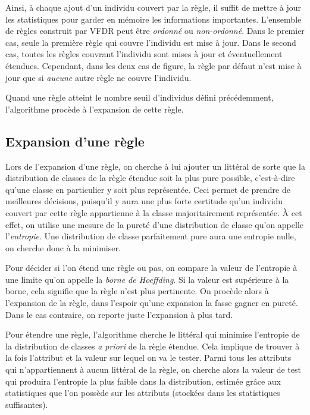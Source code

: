             Ainsi, à chaque ajout d’un individu couvert par la règle, il suffit de mettre à jour les statistiques pour garder en mémoire les informations importantes. L’ensemble de règles construit par VFDR peut être \emph{ordonné} ou \emph{non-ordonné}. Dans le premier cas, seule la première règle qui couvre l’individu est mise à jour. Dans le second cas, toutes les règles couvrant l’individu sont mises à jour et éventuellement étendues. Cependant, dans les deux cas de figure, la règle par défaut n’est mise à jour que si \emph{aucune} autre règle ne couvre l’individu.

            Quand une règle atteint le nombre seuil d’individus défini précédemment, l’algorithme procède à l'expansion de cette règle.

        \subsection{Expansion d'une règle}

            Lors de l’expansion d’une règle, on cherche à lui ajouter un littéral de sorte que la distribution de classes de la règle étendue soit la plus pure possible, c’est-à-dire qu’une classe en particulier y soit plus représentée. Ceci permet de prendre de meilleures décisions, puisqu’il y aura une plus forte certitude qu’un individu couvert par cette règle appartienne à la classe majoritairement représentée. À cet effet, on utilise une mesure de la pureté d’une distribution de classe qu’on appelle l’\emph{entropie}. Une distribution de classe parfaitement pure aura une entropie nulle, on cherche donc à la minimiser.
            
            Pour décider si l'on étend une règle ou pas, on compare la valeur de l'entropie à une limite qu'on appelle la \emph{borne de Hoeffding}. Si la valeur est supérieure à la borne, cela signifie que la règle n'est plus pertinente. On procède alors à l'expansion de la règle, dans l'espoir qu'une expansion la fasse gagner en pureté. Dans le cas contraire, on reporte juste l'expansion à plus tard.

            Pour étendre une règle, l’algorithme cherche le littéral qui minimise l’entropie de la distribution de classes \emph{a priori} de la règle étendue. Cela implique de trouver à la fois l’attribut et la valeur sur lequel on va le tester. Parmi tous les attributs qui n’appartiennent à aucun littéral de la règle, on cherche alors la valeur de test qui produira l’entropie la plus faible dans la distribution, estimée grâce aux statistiques que l’on possède sur les attributs (stockées dans les statistiques suffisantes).

